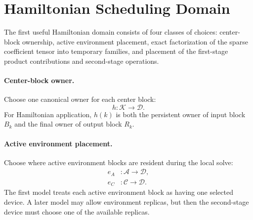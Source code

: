 \documentclass[11pt]{article}
\begin{document}
\section{Hamiltonian Scheduling Domain}

The first useful Hamiltonian domain consists of four classes of choices:
center-block ownership, active environment placement, exact factorization of
the sparse coefficient tensor into temporary families, and placement of the
first-stage product contributions and second-stage operations.

\paragraph{Center-block owner.}
Choose one canonical owner for each center block:
\begin{equation}
  h : \mathcal{K} \to \mathcal{D}.
\end{equation}
For Hamiltonian application, $h(k)$ is both the persistent owner of input block
$B_k$ and the final owner of output block $R_k$.

\paragraph{Active environment placement.}
Choose where active environment blocks are resident during the local solve:
\begin{align}
  e_A &: \mathcal{A} \to \mathcal{D}, \\
  e_C &: \mathcal{C} \to \mathcal{D}.
\end{align}
The first model treats each active environment block as having one selected
device.  A later model may allow environment replicas, but then the second-stage
device must choose one of the available replicas.
\end{document}
